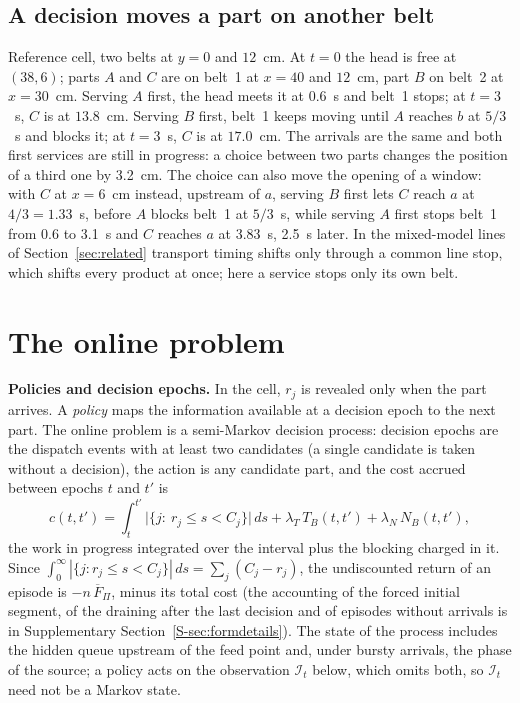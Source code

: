 \documentclass[11pt,a4paper]{article}
\theoremstyle{plain}
\theoremstyle{definition}
\theoremstyle{remark}
\newcommand{\Fpi}{\overline F_\Pi}
\newcommand{\I}{\mathcal I}
\newcommand{\Supp}[1]{Supplementary Section~\ref{S-#1}}
\begin{document}
\subsection{A decision moves a part on another belt}\label{sec:example}
Reference cell, two belts at $y=0$ and $12$~cm. At $t=0$ the head is free at $(38,6)$;
parts $A$ and $C$ are on belt~1 at $x=40$ and $12$~cm, part $B$ on belt~2 at $x=30$~cm.
Serving $A$ first, the head meets it at $0.6$~s and belt~1 stops; at $t=3$~s, $C$ is at
$13.8$~cm. Serving $B$ first, belt~1 keeps moving until $A$ reaches $b$ at $5/3$~s and
blocks it; at $t=3$~s, $C$ is at $17.0$~cm. The arrivals are the same and both first
services are still in progress: a choice between two parts changes the position of a third
one by 3.2~cm. The choice can also move the opening of a window: with $C$ at $x=6$~cm
instead, upstream of $a$, serving $B$ first lets $C$ reach $a$ at $4/3=1.33$~s, before $A$
blocks belt~1 at $5/3$~s, while serving $A$ first stops belt~1 from 0.6 to 3.1~s and $C$
reaches $a$ at 3.83~s, 2.5~s later. In the mixed-model lines of
Section~\ref{sec:related} transport timing shifts only through a common line stop, which
shifts every product at once; here a service stops only its own belt.

\section{The online problem}\label{sec:online}
\textbf{Policies and decision epochs.} In the cell, $r_j$ is revealed only when the part
arrives. A \emph{policy} maps the information available at a decision epoch to the next
part. The online problem is a semi-Markov decision process: decision epochs are the
dispatch events with at least two candidates (a single candidate is taken without a
decision), the action is any candidate part, and the cost accrued between epochs $t$ and
$t'$ is
\begin{equation}\label{eq:smdp}
c(t,t')=\int_t^{t'}\bigl|\{j:\ r_j\le s<C_j\}\bigr|\,ds+\lambda_T\,T_B(t,t')+\lambda_N\,N_B(t,t') ,
\end{equation}
the work in progress integrated over the interval plus the blocking charged in it. Since
$\int_0^\infty|\{j:r_j\le s<C_j\}|\,ds=\sum_j(C_j-r_j)$, the undiscounted return of an
episode is $-n\,\Fpi$, minus its total cost (the accounting of the forced initial segment,
of the draining after the last decision and of episodes without arrivals is in
\Supp{sec:formdetails}). The state of the process includes the hidden queue upstream of the
feed point and, under bursty arrivals, the phase of the source; a policy acts on the
observation $\I_t$ below, which omits both, so $\I_t$ need not be a Markov state.
\end{document}

